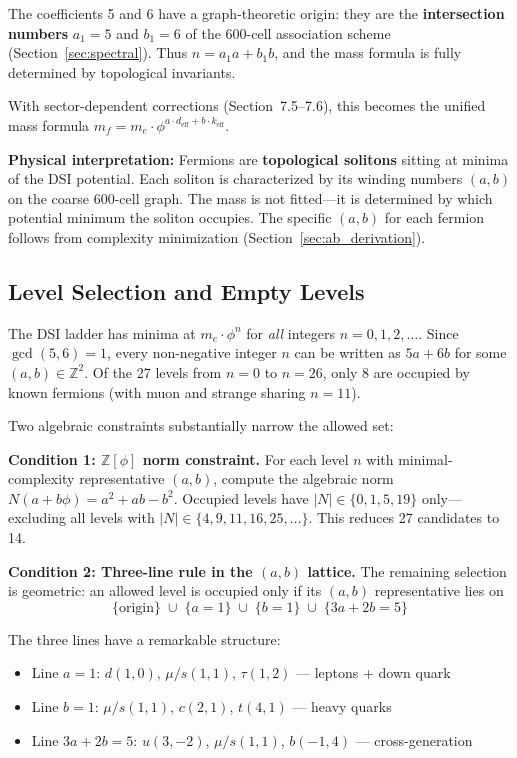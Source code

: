 \documentclass[12pt,a4paper]{article}
\begin{document}
The coefficients 5 and 6 have a graph-theoretic origin: they are the \textbf{intersection numbers} $a_1 = 5$ and $b_1 = 6$ of the 600-cell association scheme (Section~\ref{sec:spectral}). Thus $n = a_1 a + b_1 b$, and the mass formula is fully determined by topological invariants.

With sector-dependent corrections (Section~7.5--7.6), this becomes the unified mass formula $m_f = m_e \cdot \phi^{a \cdot d_{\text{eff}} + b \cdot k_{\text{eff}}}$.

\textbf{Physical interpretation:} Fermions are \textbf{topological solitons} sitting at minima of the DSI potential. Each soliton is characterized by its winding numbers $(a,b)$ on the coarse 600-cell graph. The mass is not fitted---it is determined by which potential minimum the soliton occupies. The specific $(a,b)$ for each fermion follows from complexity minimization (Section~\ref{sec:ab_derivation}).

\subsection{Level Selection and Empty Levels}
\label{sec:level_selection}

The DSI ladder has minima at $m_e \cdot \phi^n$ for \emph{all} integers $n = 0, 1, 2, \ldots$. Since $\gcd(5,6)=1$, every non-negative integer $n$ can be written as $5a + 6b$ for some $(a,b) \in \mathbb{Z}^2$. Of the 27 levels from $n=0$ to $n=26$, only 8 are occupied by known fermions (with muon and strange sharing $n=11$).

Two algebraic constraints substantially narrow the allowed set:

\textbf{Condition 1: $\mathbb{Z}[\phi]$ norm constraint.} For each level $n$ with minimal-complexity representative $(a,b)$, compute the algebraic norm $N(a + b\phi) = a^2 + ab - b^2$. Occupied levels have $|N| \in \{0, 1, 5, 19\}$ only---excluding all levels with $|N| \in \{4, 9, 11, 16, 25, \ldots\}$. This reduces 27 candidates to 14.

\textbf{Condition 2: Three-line rule in the $(a,b)$ lattice.} The remaining selection is geometric: an allowed level is occupied only if its $(a,b)$ representative lies on
\begin{equation}
\{\text{origin}\} \;\cup\; \{a = 1\} \;\cup\; \{b = 1\} \;\cup\; \{3a + 2b = 5\}
\end{equation}

The three lines have a remarkable structure:
\begin{itemize}
    \item Line $a = 1$: $d(1,0)$, $\mu/s(1,1)$, $\tau(1,2)$ --- leptons + down quark
    \item Line $b = 1$: $\mu/s(1,1)$, $c(2,1)$, $t(4,1)$ --- heavy quarks
    \item Line $3a+2b = 5$: $u(3,-2)$, $\mu/s(1,1)$, $b(-1,4)$ --- cross-generation
\end{itemize}
\end{document}
